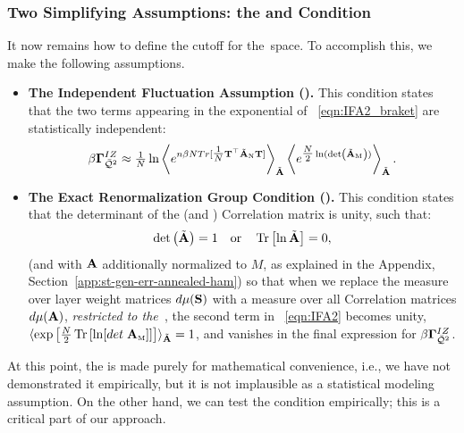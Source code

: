 \subsubsection{Two Simplifying Assumptions: the \IFA and \TRACELOG Condition}
\label{sxn:matgen_quality_hciz_C}

It now remains how to define the cutoff for the~\ECS space. To accomplish this, we make the following assumptions.
\begin{itemize}
\item
\textbf{The Independent Fluctuation Assumption (\IFA).}
This condition states that the two terms appearing in the exponential of \EQN~\ref{eqn:IFA2_braket} are statistically independent:
\begin{align}
  \label{eqn:IFA2}
  \beta\mathbf{\Gamma}^{IZ}_{\bar{\mathcal{Q}}^{2}} \approx 
    \tfrac{1}{N}
\ln
  \left\langle
  e^{n\beta N Tr[ \tfrac{1}{N}{\mathbf{T}}^{\top}\tilde{\mathbf{A}}_{\text{\tiny N}}{\mathbf{T}}] }
  \right\rangle_{\tilde{\mathbf{A}}}
  \left\langle
  e^{\tfrac{N}{2}\ln(\mbox{}{\text{det}}\left(\tilde{\mathbf{A}}_{\text{\tiny M}}\right))}
    \right\rangle_{\tilde{\mathbf{A}}}.
\end{align}
\item
\textbf{The Exact Renormalization Group Condition (\TRACELOG).}
This condition states that the determinant of the \Student (and \Teacher) Correlation matrix is unity, such that:
\begin{align}
\label{eqn:tlc_mm}
\mbox{}{\text{det}}\left(\tilde{\mathbf{A}}\right)=1 
\quad\mbox{or}\quad
\mbox{}\operatorname{Tr}\left[\ln \tilde{\mathbf{A}}\right]=0  ,
\end{align}
(and with $\mathbf{A}$ additionally normalized to $M$, as explained in the Appendix, Section~\ref{app:st-gen-err-annealed-ham})
so that when we replace the measure over \Student layer weight matrices $d\mu({\mathbf{S}})$ with a measure over all \Student Correlation matrices $d\mu(\mathbf{A})$,
\emph{restricted to the~\ECS}, the second term in \EQN~\ref{eqn:IFA2} becomes unity, $\langle \exp\left[\tfrac{N}{2} \mbox{}\operatorname{Tr}\left[ \ln[det\;{\mathbf{A}}_{\text{\tiny M}}] \right] \right]\rangle_{\tilde{\mathbf{A}}}=1$,
and vanishes in the final expression for $\beta\mathbf{\Gamma}^{IZ}_{\bar{\mathcal{Q}}^{2}}$.
\end{itemize}

\noindent
At this point, the \IFA is made purely for mathematical convenience, i.e., 
we have not demonstrated it empirically, but it is not implausible as a statistical modeling assumption. 
On the other hand, we can test the \TRACELOG condition empirically;
this is a critical part of our \SETOL approach.


